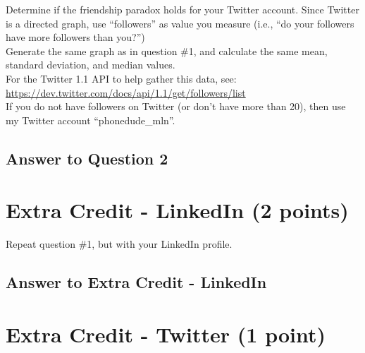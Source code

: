\documentclass{article}
\begin{document}
Determine if the friendship paradox holds for your Twitter account. Since Twitter is a directed graph, use ``followers'' as value you measure (i.e., ``do your followers have more followers than you?'') \\

Generate the same graph as in question \#1, and calculate the same mean, standard deviation, and median values. \\

For the Twitter 1.1 API to help gather this data, see: \\

\url{https://dev.twitter.com/docs/api/1.1/get/followers/list} \\

If you do not have followers on Twitter (or don't have more than 20), then use my Twitter account ``phonedude\_mln''.


\subsection*{Answer to Question 2}


\clearpage

\section*{Extra Credit - LinkedIn (2 points)}

Repeat question \#1, but with your LinkedIn profile.

\subsection*{Answer to Extra Credit - LinkedIn}

\clearpage

\section*{Extra Credit - Twitter (1 point)}
\end{document}
